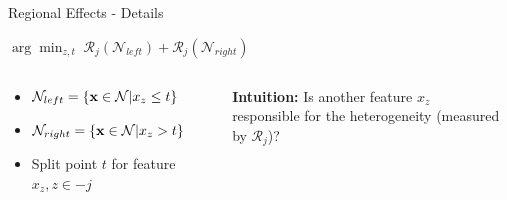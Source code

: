 \documentclass[10pt,compress,t,notes=noshow, xcolor=table]{beamer}
\begin{document}
\begin{frame}{Regional Effects - Details}
\medskip

\centerline{$\arg \min_{z, t} \; \mathcal{R}_j\left(\mathcal{N}_{left}\right) + \mathcal{R}_j\left(\mathcal{N}_{right}\right)$}

      \begin{columns}[c, totalwidth=\textwidth]
        \begin{column}{0.57\textwidth}
    \begin{itemize}
        \item $\mathcal{N}_{left} = \{\mathbf{x} \in \mathcal{N}|x_z \leq t\}$
        \item $\mathcal{N}_{right} = \{\mathbf{x} \in \mathcal{N}|x_z > t\}$
        \item Split point $t$ for feature $x_z, z \in -j$
    \end{itemize}
        \end{column}
          \begin{column}{0.43\textwidth}
          \centering
          \textbf{Intuition:} Is another feature $x_z$ \\responsible for the heterogeneity (measured by $\mathcal{R}_j$)?
        \end{column}
    \end{columns}
\end{frame}
\end{document}
